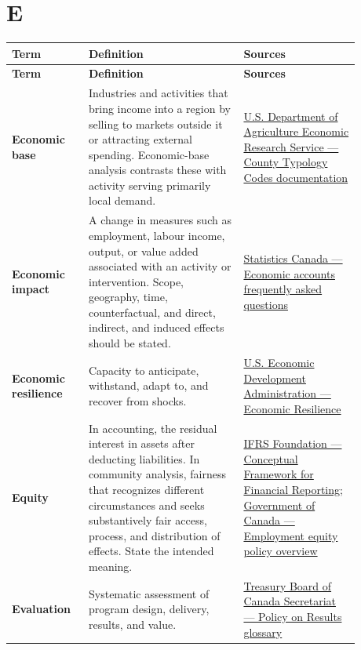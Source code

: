 \documentclass[11pt,letterpaper,oneside,openany]{book}
\begin{document}
\section[E]{E}
\begin{center}
\small
\setlength{\LTpre}{0.4em}
\setlength{\LTpost}{0.8em}
\begin{longtable}{>{\RaggedRight\arraybackslash}p{0.180\linewidth}>{\RaggedRight\arraybackslash}p{0.400\linewidth}>{\RaggedRight\arraybackslash}p{0.300\linewidth}}
\rowcolor{DeepNavy}
\color{white}\bfseries Term & \color{white}\bfseries Definition & \color{white}\bfseries Sources \\
\endfirsthead
\rowcolor{DeepNavy}
\color{white}\bfseries Term & \color{white}\bfseries Definition & \color{white}\bfseries Sources \\
\endhead
\textbf{Economic base} & Industries and activities that bring income into a region by selling to markets outside it or attracting external spending. Economic-base analysis contrasts these with activity serving primarily local demand. & \href{https://www.ers.usda.gov/data-products/county-typology-codes/documentation}{U.S. Department of Agriculture Economic Research Service --- County Typology Codes documentation} \\
\textbf{Economic impact} & A change in measures such as employment, labour income, output, or value added associated with an activity or intervention. Scope, geography, time, counterfactual, and direct, indirect, and induced effects should be stated. & \href{https://www.statcan.gc.ca/en/subjects-start/economic\_accounts/faq}{Statistics Canada --- Economic accounts frequently asked questions} \\
\textbf{Economic resilience} & Capacity to anticipate, withstand, adapt to, and recover from shocks. & \href{https://www.eda.gov/resources/comprehensive-economic-development-strategy/content/economic-resilience}{U.S. Economic Development Administration --- Economic Resilience} \\
\textbf{Equity} & In accounting, the residual interest in assets after deducting liabilities. In community analysis, fairness that recognizes different circumstances and seeks substantively fair access, process, and distribution of effects. State the intended meaning. & \href{https://www.ifrs.org/issued-standards/list-of-standards/conceptual-framework/?headerSearchOption=phrase}{IFRS Foundation --- Conceptual Framework for Financial Reporting}; \href{https://www.canada.ca/en/employment-social-development/corporate/portfolio/labour/programs/employment-equity/reports/act-review-overview-backgrounder-policy-issues.html}{Government of Canada --- Employment equity policy overview} \\
\textbf{Evaluation} & Systematic assessment of program design, delivery, results, and value. & \href{https://www.tbs-sct.canada.ca/pol/doc-eng.aspx?id=31300\&section=glossary}{Treasury Board of Canada Secretariat --- Policy on Results glossary} \\
\end{longtable}
\end{center}
\end{document}
